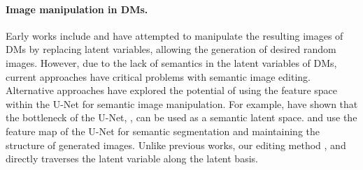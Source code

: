 \paragraph{Image manipulation in DMs.}
Early works include \citet{choi2021ilvr} and \citet{meng2021sdedit} have attempted to manipulate the resulting images of DMs by replacing latent variables, allowing the generation of desired random images. 
However, due to the lack of semantics in the latent variables of DMs, current approaches have critical problems with semantic image editing.
Alternative approaches have explored the potential of using the feature space within the U-Net for semantic image manipulation. For example, \citet{kwon2022diffusion} have shown that the bottleneck of the U-Net, \ehspace{}, can be used as a semantic latent space.  \citet{baranchuk2021label} and \citet{tumanyan2022plug} use the feature map of the U-Net for semantic segmentation and maintaining the structure of generated images. 
Unlike previous works, our editing method , and directly traverses the latent variable along the latent basis.



